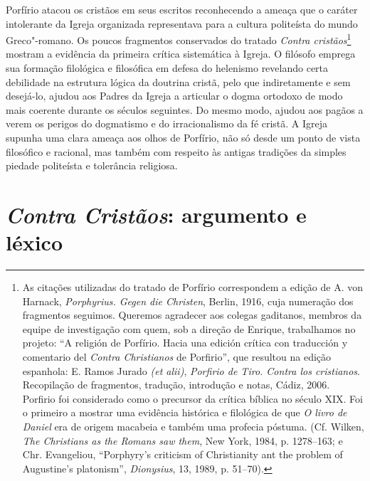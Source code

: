 Porfírio atacou os cristãos em seus escritos reconhecendo a ameaça
que o caráter intolerante da Igreja organizada representava para a
cultura politeísta do mundo Greco"-romano.  Os poucos fragmentos
conservados do tratado \textit{Contra cristãos}\footnote{ As citações
utilizadas do tratado de Porfírio correspondem a edição
de A. von Harnack,
\textit{Porphyrius. Gegen die Christen}{,
Berlin, 1916}{, cuja numeração dos fragmentos
seguimos.} Queremos agradecer aos colegas gaditanos, membros da equipe
de investigação com quem, sob a direção de Enrique, trabalhamos no
projeto: “A religión de Porfírio. Hacia una edición crítica con
traducción y comentario del \textit{Contra Christianos} de Porfirio”,
que resultou na edição espanhola{: E. Ramos Jurado}
{\textit{(et alii)}}{,}
{\textit{Porfirio de Tiro. Contra los
cristianos}}{. Recopilação de fragmentos, tradução,
introdução e notas, Cádiz, 2006.}  Porfirio foi considerado como o
precursor da crítica bíblica no século XIX. Foi o primeiro a mostrar
uma evidência histórica e filológica de que \textit{O livro de Daniel}
era de origem macabeia e também uma profecia póstuma. (Cf. Wilken,
\textit{The Christians as the Romans saw them}, New York, 1984, p.
1278--163; e Chr. Evangeliou, “Porphyry’s criticism of Christianity ant
the problem of Augustine’s platonism”, \textit{Dionysius}, 13, 1989,  p.
51--70).\par }  mostram a evidência da primeira crítica sistemática à
Igreja. O filósofo emprega sua formação filológica e filosófica em
defesa do helenismo revelando certa debilidade na estrutura lógica da
doutrina cristã, pelo que indiretamente e sem desejá-lo, ajudou aos
Padres da Igreja a articular o dogma ortodoxo de modo mais coerente
durante os séculos seguintes. Do mesmo modo, ajudou aos pagãos a verem
os perigos do dogmatismo e do irracionalismo da fé cristã. A Igreja
supunha uma clara ameaça aos olhos de Porfírio, não só desde um ponto
de vista filosófico e racional, mas também com respeito às antigas
tradições da simples piedade politeísta e tolerância religiosa.

\section{\textit{Contra Cristãos}: argumento e léxico}

